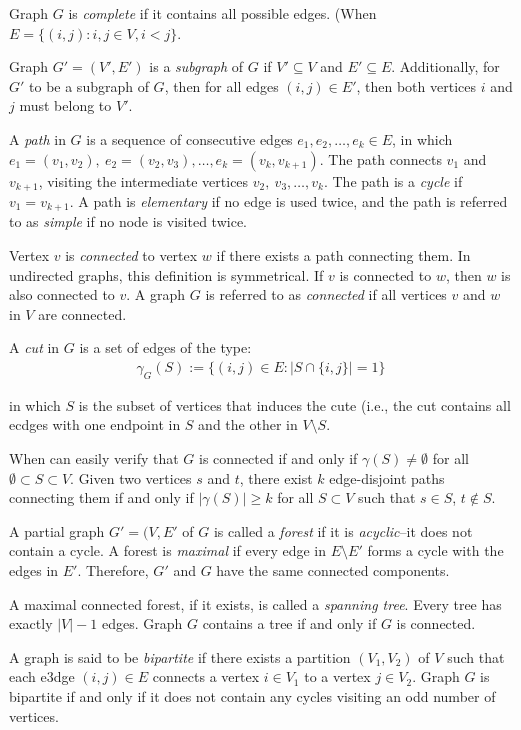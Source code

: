 \documentclass[12pt]{article}
\theoremstyle{definition}
\begin{document}
Graph $G$ is \emph{complete}  if it contains all possible edges. (When $E = \{(i,j): i,j \in V, i < j\}$. 

Graph $G' = (V', E')$ is a \emph{subgraph} of $G$ if $V' \subseteq V$ and $E' \subseteq E$. Additionally, for $G'$ to be a subgraph of $G$, then for all edges $(i,j) \in E'$, then both vertices $i$ and $j$ must belong to $V'$.

A \emph{path} in $G$ is a sequence of consecutive edges $e_1, e_2, \dots, e_k \in E$, in which $e_1 = (v_1, v_2), \ e_2 = (v_2, v_3), \dots, e_k = (v_k, v_{k+1})$. The path connects $v_1$ and $v_{k+1}$, visiting the intermediate vertices $v_2, \ v_3, \dots, v_k$. The path is a \emph{cycle} if $v_1 = v_{k+1}$. A path is \emph{elementary} if no edge is used twice, and the path is referred to as \emph{simple} if no node is visited twice. 

Vertex $v$ is \emph{connected} to vertex $w$ if there exists a path connecting them. In undirected graphs, this definition is symmetrical. If $v$ is connected to $w$, then $w$ is also connected to $v$. A graph $G$ is referred to as \emph{connected} if all vertices $v$ and $w$ in $V$ are connected.

A \emph{cut} in $G$ is a set of edges of the type:
\begin{align*}
\gamma_G(S):= \{(i,j) \in E: |S \cap \{i,j\} | = 1\}
\end{align*}

in which $S$ is the subset of vertices that induces the cute (i.e., the cut contains all ecdges with one endpoint in $S$ and the other in $V \setminus S$. 

When can easily verify that $G$ is connected if and only if $\gamma(S) \ne \emptyset$ for all $\emptyset \subset S \subset V$. Given two vertices $s$ and $t$, there exist $k$ edge-disjoint paths connecting them if and only if $|\gamma(S)| \ge k$ for all $S \subset V$ such that $s \in S$, $t \notin S$.

A partial graph $G' = (V, E'$ of $G$ is called a \emph{forest} if it is \emph{acyclic}--it does not contain a cycle. A forest is \emph{maximal} if every edge in $E \setminus E'$ forms a cycle with the edges in $E'$. Therefore, $G'$ and $G$ have the same connected components. 

A maximal connected forest, if it exists, is called a \emph{spanning tree}. Every tree has exactly $|V| - 1$ edges. Graph $G$ contains a tree if and only if $G$ is connected. 

A graph is said to be \emph{bipartite} if there exists a partition $(V_1, V_2)$ of $V$ such that each e3dge $(i,j) \in E$ connects a vertex $i \in V_1$ to a vertex $j \in V_2$. Graph $G$ is bipartite if and only if it does not contain any cycles visiting an odd number of vertices.
\end{document}
